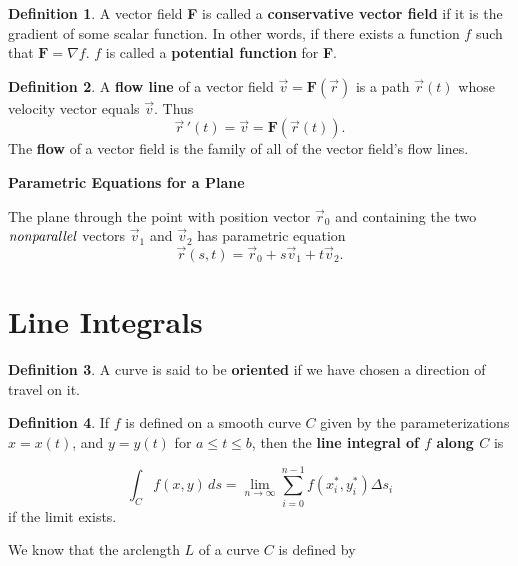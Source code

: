 \documentclass[12pt, a4paper]{article}
\theoremstyle{plain}
\theoremstyle{definition}
\newtheorem{definition}{Definition}[section]
\theoremstyle{remark}
\begin{document}
\begin{definition} A vector field \textbf{F} is called a \textbf{conservative vector field} if it is the gradient of some scalar function. In other words, if there exists a function $f$ such that $\textbf{F} = \nabla f$. $f$ is called a \textbf{potential function} for \textbf{F}.
\end{definition}

\begin{definition}
A \textbf{flow line} of a vector field $\vec{v} = \textbf{F}(\vec{r})$ is a path $\vec{r}(t)$ whose velocity vector equals $\vec{v}$. Thus 
$$\vec{r} \, '(t) = \vec{v} = \textbf{F}(\vec{r}(t)). $$
The \textbf{flow} of a vector field is the family of all of the vector field's flow lines.
\end{definition}


\textbf{Parametric Equations for a Plane}

The plane through the point with position vector $\vec{r}_0$ and containing the two $\it{nonparallel}$ vectors $\vec{v}_1$ and $\vec{v}_2$ has parametric equation
$$ \vec{r}(s, t) = \vec{r}_0 + s\vec{v}_1 + t\vec{v}_2.$$




















\newpage
\part{Line Integrals}


\begin{definition}
A curve is said to be \textbf{oriented} if we have chosen a direction of travel on it.
\end{definition}

\begin{definition} If $f$ is defined on a smooth curve $C$ given by the parameterizations $x=x(t)$, and $y=y(t)$ for $a \le t \le b$, then the \textbf{line integral of $f$ along $C$} is 

$$ \int_C f(x, y) \,ds = \lim_{n\to\infty} \sum_{i=0}^{n-1} f(x_i^*, y_i^*) \Delta s_i $$
if the limit exists. 
\end{definition}

We know that the arclength $L$ of a curve $C$ is defined by 
\end{document}
